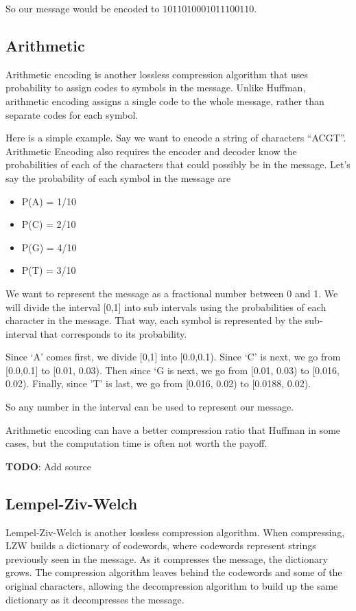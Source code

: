 \documentclass[12pt,twoside]{reedthesis}
\providecommand{\tightlist}{%
  \setlength{\itemsep}{0pt}\setlength{\parskip}{0pt}}
\begin{document}
So our message would be encoded to \(1011010001011100110\).

\hypertarget{arithmetic}{%
\subsection{Arithmetic}\label{arithmetic}}

Arithmetic encoding is another lossless compression algorithm that uses probability to assign codes to symbols in the message. Unlike Huffman, arithmetic encoding assigns a single code to the whole message, rather than separate codes for each symbol.

Here is a simple example. Say we want to encode a string of characters ``ACGT''. Arithmetic Encoding also requires the encoder and decoder know the probabilities of each of the characters that could possibly be in the message. Let's say the probability of each symbol in the message are
\begin{itemize}
\tightlist
\item
  P(A) = 1/10
\item
  P(C) = 2/10
\item
  P(G) = 4/10
\item
  P(T) = 3/10
\end{itemize}
We want to represent the message as a fractional number between 0 and 1. We will divide the interval {[}0,1{]} into sub intervals using the probabilities of each character in the message. That way, each symbol is represented by the sub-interval that corresponds to its probability.

Since `A' comes first, we divide {[}0,1{]} into {[}0.0,0.1). Since `C' is next, we go from {[}0.0,0.1{]} to {[}0.01, 0.03). Then since `G is next, we go from {[}0.01, 0.03) to {[}0.016, 0.02). Finally, since 'T' is last, we go from {[}0.016, 0.02) to {[}0.0188, 0.02).

So any number in the interval can be used to represent our message.

Arithmetic encoding can have a better compression ratio that Huffman in some cases, but the computation time is often not worth the payoff.

\textbf{TODO}: Add source

\hypertarget{lempel-ziv-welch}{%
\subsection{Lempel-Ziv-Welch}\label{lempel-ziv-welch}}

Lempel-Ziv-Welch is another lossless compression algorithm. When compressing, LZW builds a dictionary of codewords, where codewords represent strings previously seen in the message. As it compresses the message, the dictionary grows. The compression algorithm leaves behind the codewords and some of the original characters, allowing the decompression algorithm to build up the same dictionary as it decompresses the message.
\end{document}
